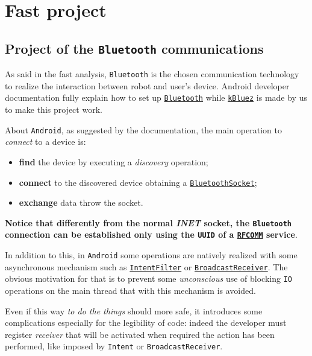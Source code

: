 \section{Fast project}

\subsection{Project of the \texttt{Bluetooth} communications}

As said in the fast analysis, \texttt{Bluetooth} is the chosen communication technology to realize the interaction between robot and user's device.
Android developer documentation fully explain how to set up \href{https://developer.android.com/guide/topics/connectivity/bluetooth}{\texttt{Bluetooth}} while \href{https://github.com/LM-96/MobileSystemProject/tree/main/kBluez}{\texttt{kBluez}} is made by us to make this project work.

About \texttt{Android}, as suggested by the documentation, the main operation to \textit{connect} to a device is:
\begin{itemize}
	\item \textbf{find} the device by executing a \textit{discovery} operation;
	\item \textbf{connect} to the discovered device obtaining a \href{https://developer.android.com/reference/android/bluetooth/BluetoothSocket}{\texttt{BluetoothSocket}};
	\item \textbf{exchange} data throw the socket.
\end{itemize}
\textbf{Notice that differently from the normal \textit{INET} socket, the \texttt{Bluetooth} connection can be established only using the \texttt{UUID} of a \href{https://en.wikipedia.org/wiki/List_of_Bluetooth_protocols\#Radio_frequency_communication_(RFCOMM)}{\texttt{RFCOMM}} service}.

In addition to this, in \texttt{Android} some operations are natively realized with some asynchronous mechanism such as \href{https://developer.android.com/reference/android/content/IntentFilter}{\texttt{IntentFilter}} or \href{https://developer.android.com/reference/android/content/BroadcastReceiver}{\texttt{BroadcastReceiver}}. The obvious motivation for that is to prevent some \textit{unconscious} use of blocking \texttt{IO} operations on the main thread that with this mechanism is avoided.

Even if this way \textit{to do the things} should more safe, it introduces some complications especially for the legibility of code: indeed the developer must register \textit{receiver} that will be activated when required the action has been performed, like imposed by \texttt{Intent} or \texttt{BroadcastReceiver}.

